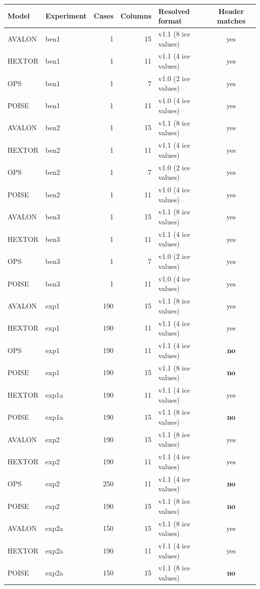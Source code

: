 \scriptsize
\begin{tabular}{llrrlc}
\toprule
Model & Experiment & Cases & Columns & Resolved format & Header matches \\
\midrule
AVALON & ben1 & 1 & 15 & v1.1 (8 ice values) & yes \\
HEXTOR & ben1 & 1 & 11 & v1.1 (4 ice values) & yes \\
OPS & ben1 & 1 & 7 & v1.0 (2 ice values) & yes \\
POISE & ben1 & 1 & 11 & v1.0 (4 ice values) & yes \\
AVALON & ben2 & 1 & 15 & v1.1 (8 ice values) & yes \\
HEXTOR & ben2 & 1 & 11 & v1.1 (4 ice values) & yes \\
OPS & ben2 & 1 & 7 & v1.0 (2 ice values) & yes \\
POISE & ben2 & 1 & 11 & v1.0 (4 ice values) & yes \\
AVALON & ben3 & 1 & 15 & v1.1 (8 ice values) & yes \\
HEXTOR & ben3 & 1 & 11 & v1.1 (4 ice values) & yes \\
OPS & ben3 & 1 & 7 & v1.0 (2 ice values) & yes \\
POISE & ben3 & 1 & 11 & v1.0 (4 ice values) & yes \\
AVALON & exp1 & 190 & 15 & v1.1 (8 ice values) & yes \\
HEXTOR & exp1 & 190 & 11 & v1.1 (4 ice values) & yes \\
OPS & exp1 & 190 & 11 & v1.1 (4 ice values) & \textbf{no} \\
POISE & exp1 & 190 & 15 & v1.1 (8 ice values) & \textbf{no} \\
HEXTOR & exp1a & 190 & 11 & v1.1 (4 ice values) & yes \\
POISE & exp1a & 190 & 15 & v1.1 (8 ice values) & \textbf{no} \\
AVALON & exp2 & 190 & 15 & v1.1 (8 ice values) & yes \\
HEXTOR & exp2 & 190 & 11 & v1.1 (4 ice values) & yes \\
OPS & exp2 & 250 & 11 & v1.1 (4 ice values) & \textbf{no} \\
POISE & exp2 & 190 & 15 & v1.1 (8 ice values) & \textbf{no} \\
AVALON & exp2a & 150 & 15 & v1.1 (8 ice values) & yes \\
HEXTOR & exp2a & 190 & 11 & v1.1 (4 ice values) & yes \\
POISE & exp2a & 150 & 15 & v1.1 (8 ice values) & \textbf{no} \\

\end{tabular}
